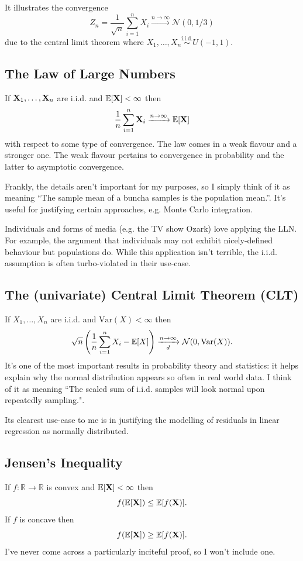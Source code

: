 \documentclass[11pt]{article}
\begin{document}
\begin{appendices}
It illustrates the convergence
$$
Z_n
=
\frac{1}{\sqrt{n}}\sum_{i=1}^n X_i
\xrightarrow{n\to\infty}
\mathcal{N}(0,1/3)
$$
due to the central limit theorem where $X_1,\dots,X_n\overset{\text{i.i.d.}}{\sim}U(-1,1)$.

\subsection{The Law of Large Numbers}
If $\mathbf{X}_1,\dots,\mathbf{X}_n$ are i.i.d. and $\mathbb{E}[\mathbf{X}]<\infty$ then
$$
\frac{1}{n}\sum_{i=1}^n\mathbf{X}_i
\xrightarrow{n\to\infty}
\mathbb{E}[\mathbf{X}]
$$
with respect to some type of convergence. The law comes in a weak flavour and a stronger one. The weak flavour pertains to convergence in probability and the latter to asymptotic convergence.

Frankly, the details aren't important for my purposes, so I simply think of it as meaning ``The sample mean of a buncha samples is the population mean.''. It's useful for justifying certain approaches, e.g. Monte Carlo integration.

\begin{tcolorbox}[title={\centering\textbf{i.i.d. assumption}}, colback=myLightBlue, colbacktitle=myDarkBlue, colframe=myDarkBlue, coltitle=white]
    Individuals and forms of media (e.g. the TV show Ozark) love applying the LLN. For example, the argument that individuals may not exhibit nicely-defined behaviour but populations do. While this application isn't terrible, the i.i.d. assumption is often turbo-violated in their use-case.
\end{tcolorbox}

\subsection{The (univariate) Central Limit Theorem (CLT)}
If $X_1,\dots,X_n$ are i.i.d. and $\text{Var}(X)<\infty$ then
$$
\sqrt{n}\left(\frac{1}{n}\sum_{i=1}^nX_i-\mathbb{E}[X]\right)
\xrightarrow[d]{n\to\infty}
\mathcal{N}(0,\text{Var}(X)).
$$
It's one of the most important results in probability theory and statistics: it helps explain why the normal distribution appears so often in real world data. I think of it as meaning ``The scaled sum of i.i.d. samples will look normal upon repeatedly sampling.".

Its clearest use-case to me is in justifying the modelling of residuals in linear regression as normally distributed.

\subsection{Jensen's Inequality}
If $f:\mathbb{R}\to\mathbb{R}$ is convex and $\mathbb{E}[\mathbf{X}]<\infty$ then
$$
f(\mathbb{E}[\mathbf{X}])\leq\mathbb{E}[f(\mathbf{X})].
$$
If $f$ is concave then
$$
f(\mathbb{E}[\mathbf{X}])\geq\mathbb{E}[f(\mathbf{X})].
$$
I've never come across a particularly inciteful proof, so I won't include one.


\end{appendices}
\end{document}
